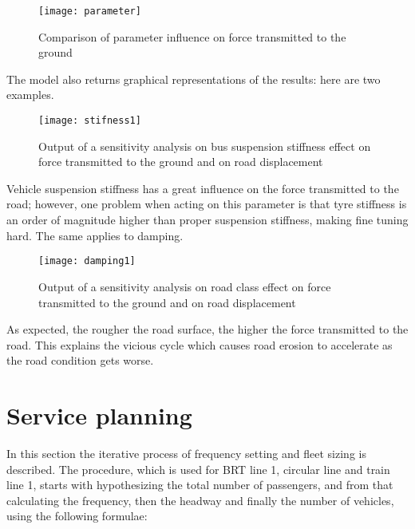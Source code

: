 \documentclass{article}
\begin{document}
\begin{figure}[H]
\centering
\texttt{[image: parameter]}
\caption{Comparison of parameter influence on force transmitted to the ground}
\end{figure}
The model also returns graphical representations of the results: here are two examples. 
\begin{figure}[H]
\centering
\texttt{[image: stifness1]}
\caption{Output of a sensitivity analysis on bus suspension stiffness effect on force transmitted to the ground and on road displacement}
\end{figure}
Vehicle suspension stiffness has a great influence on the force transmitted to the road; however, one problem when acting on this parameter is that tyre stiffness is an order of magnitude higher than proper suspension stiffness, making fine tuning hard. The same applies to damping. 
\begin{figure}[H]
\centering
\texttt{[image: damping1]}
\caption{Output of a sensitivity analysis on road class effect on force transmitted to the ground and on road displacement}
\end{figure}
As expected, the rougher the road surface, the higher the force transmitted to the road. This explains the vicious cycle which causes road erosion to accelerate as the road condition gets worse. 
\newpage
\section{Service planning} %
In this section the iterative process of frequency setting and fleet sizing is described. 
The procedure, which is used for BRT line 1, circular line and train line 1, starts with hypothesizing the total number of passengers, and from that calculating the frequency, then the headway and finally the number of vehicles, using the following formulae:
\end{document}
